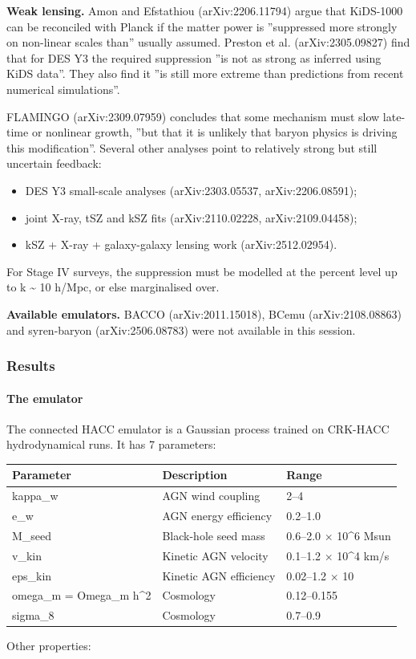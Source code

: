 \documentclass[11pt,a4paper]{article}
\begin{document}
\textbf{Weak lensing.} Amon and Efstathiou (arXiv:2206.11794) argue that KiDS-1000 can be reconciled with Planck if the matter power is ''suppressed more strongly on non-linear scales than'' usually assumed. Preston et al. (arXiv:2305.09827) find that for DES Y3 the required suppression ''is not as strong as inferred using KiDS data''. They also find it ''is still more extreme than predictions from recent numerical simulations''.

FLAMINGO (arXiv:2309.07959) concludes that some mechanism must slow late-time or nonlinear growth, ''but that it is unlikely that baryon physics is driving this modification''. Several other analyses point to relatively strong but still uncertain feedback:

\begin{itemize}
  \item DES Y3 small-scale analyses (arXiv:2303.05537, arXiv:2206.08591);
  \item joint X-ray, tSZ and kSZ fits (arXiv:2110.02228, arXiv:2109.04458);
  \item kSZ + X-ray + galaxy-galaxy lensing work (arXiv:2512.02954).
\end{itemize}
For Stage IV surveys, the suppression must be modelled at the percent level up to k \textasciitilde{} 10 h/Mpc, or else marginalised over.

\textbf{Available emulators.} BACCO (arXiv:2011.15018), BCemu (arXiv:2108.08863) and syren-baryon (arXiv:2506.08783) were not available in this session.

\subsubsection*{Results}
\paragraph{The emulator}
The connected HACC emulator is a Gaussian process trained on CRK-HACC hydrodynamical runs. It has 7 parameters:

\begin{longtable}{@{}p{}p{}p{}@{}}
\toprule
\textbf{Parameter} & \textbf{Description} & \textbf{Range} \\ \midrule \endhead
kappa\_w & AGN wind coupling & 2--4 \\
e\_w & AGN energy efficiency & 0.2--1.0 \\
M\_seed & Black-hole seed mass & 0.6--2.0 $\times$ 10\textasciicircum{}6 Msun \\
v\_kin & Kinetic AGN velocity & 0.1--1.2 $\times$ 10\textasciicircum{}4 km/s \\
eps\_kin & Kinetic AGN efficiency & 0.02--1.2 $\times$ 10 \\
omega\_m = Omega\_m h\textasciicircum{}2 & Cosmology & 0.12--0.155 \\
sigma\_8 & Cosmology & 0.7--0.9 \\
\bottomrule\end{longtable}
Other properties:
\end{document}
